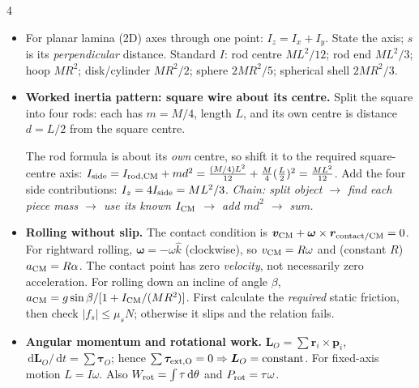 \documentclass[10pt,landscape]{article}
\newenvironment{tightcenter}{\setlength\topsep{0pt}\setlength\parskip{0pt}\begin{center}}{\end{center}}
\newcommand{\vct}[1]{\bm{#1}}
\newcommand{\dd}{\,\mathrm d}
\begin{document}
\begin{multicols*}{4}
\begin{itemize}
    \item For planar lamina (2D) axes through one point: $I_z=I_x+I_y$. State the axis; $s$ is its \emph{perpendicular} distance. Standard $I$: rod centre $ML^2/12$; rod end $ML^2/3$; hoop $MR^2$; disk/cylinder $MR^2/2$; sphere $2MR^2/5$; spherical shell $2MR^2/3$.
    \item \textbf{Worked inertia pattern: square wire about its centre.} Split the square into four rods: each has $m=M/4$, length $L$, and its own centre is distance $d=L/2$ from the square centre.
    \begin{tightcenter}\end{tightcenter}
    The rod formula is about its \emph{own} centre, so shift it to the required square-centre axis: $I_{\rm side}=I_{\rm rod,CM}+md^2=\frac{(M/4)L^2}{12}+\frac M4(\frac L2)^2=\frac{ML^2}{12}$. Add the four side contributions: $I_z=4I_{\rm side}={ML^2/3}$. \emph{Chain: split object $\to$ find each piece mass $\to$ use its known $I_{\rm CM}$ $\to$ add $md^2$ $\to$ sum.}
    \begin{tightcenter}\end{tightcenter}    \item \textbf{Rolling without slip.} The contact condition is $\vct v_{\rm CM}+\vct\omega\times\vct r_{\rm contact/CM}=0$. For rightward rolling, $\vct\omega=-\omega\hat k$ (clockwise), so $v_{\rm CM}=R\omega$ and (constant $R$) $a_{\rm CM}=R\alpha$. The contact point has zero \emph{velocity}, not necessarily zero acceleration. For rolling down an incline of angle $\beta$, $a_{\rm CM}=g\sin\beta/[1+I_{\rm CM}/(MR^2)]$. First calculate the \emph{required} static friction, then check $|f_s|\le\mu_sN$; otherwise it slips and the relation fails.    \item \textbf{Angular momentum and rotational work.} $\vct L_O=\sum\vct r_i\times\vct p_i$, $\dd\vct L_O/\dd t=\sum\vct\tau_O$; hence $\sum\vct\tau_{\rm ext,O}=0\Rightarrow\vct L_O=\text{constant}$. For fixed-axis motion $L=I\omega$. Also $W_{\rm rot}=\int\tau\dd\theta$ and $P_{\rm rot}=\tau\omega$.

\end{itemize}
\end{multicols*}
\end{document}
